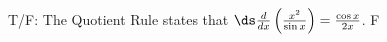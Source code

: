 {T/F: The Quotient Rule states that $\ds \frac{d}{dx}\left(\frac{x^2}{\sin x}\right) = \frac{\cos x}{2x}$.
}
{F
}

